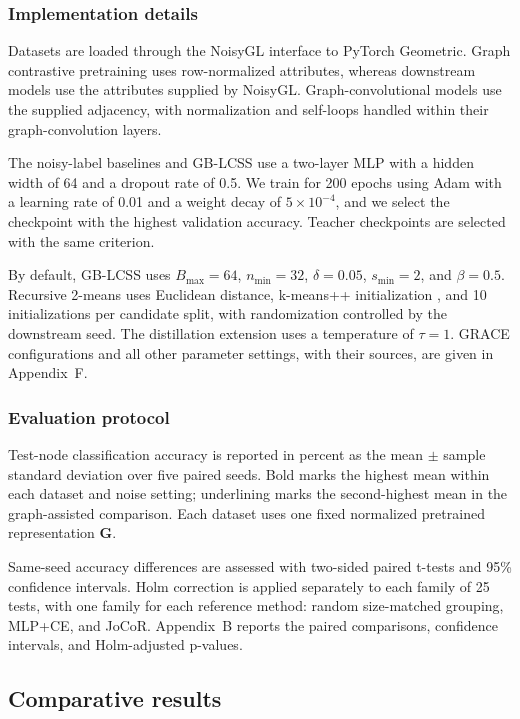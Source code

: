 \documentclass[times,review,10pt]{elsarticle}
\theoremstyle{definition}
\theoremstyle{plain}
\begin{document}
\subsubsection{Implementation details}\label{sec:4.1.4}

Datasets are loaded through the NoisyGL interface to PyTorch Geometric. Graph contrastive pretraining uses row-normalized attributes, whereas downstream models use the attributes supplied by NoisyGL. Graph-convolutional models use the supplied adjacency, with normalization and self-loops handled within their graph-convolution layers.

The noisy-label baselines and GB-LCSS use a two-layer MLP with a hidden width of 64 and a dropout rate of 0.5. We train for 200 epochs using Adam with a learning rate of 0.01 and a weight decay of \(5 \times 10^{- 4}\), and we select the checkpoint with the highest validation accuracy. Teacher checkpoints are selected with the same criterion.

By default, GB-LCSS uses \(B_{\max} = 64\), \(n_{\min} = 32\), \(\delta = 0.05\), \(s_{\min} = 2\), and \(\beta = 0.5\). Recursive 2-means uses Euclidean distance, k-means++ initialization \cite{ref71}, and 10 initializations per candidate split, with randomization controlled by the downstream seed. The distillation extension uses a temperature of \(\tau = 1\). GRACE configurations and all other parameter settings, with their sources, are given in Appendix~F.

\subsubsection{Evaluation protocol}\label{sec:4.1.5}

Test-node classification accuracy is reported in percent as the mean \ensuremath{\pm} sample standard deviation over five paired seeds. Bold marks the highest mean within each dataset and noise setting; underlining marks the second-highest mean in the graph-assisted comparison. Each dataset uses one fixed normalized pretrained representation \(\mathbf G\).

Same-seed accuracy differences are assessed with two-sided paired t-tests and 95\% confidence intervals. Holm correction \cite{ref72} is applied separately to each family of 25 tests, with one family for each reference method: random size-matched grouping, MLP+CE, and JoCoR. Appendix~B reports the paired comparisons, confidence intervals, and Holm-adjusted p-values.

\subsection{Comparative results}\label{sec:4.2}
\end{document}
